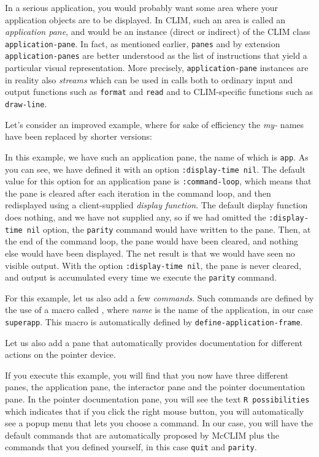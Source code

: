 In a serious application, you would probably want some area where your
application objects are to be displayed.  In CLIM, such an area is
called an \emph{application pane}, and would be an instance (direct or
indirect) of the CLIM class \texttt{application-pane}.  In fact, as
mentioned earlier, \texttt{panes} and by extension
\texttt{application-panes} are better understood as the list of
instructions that yield a particular visual representation. More
precisely, \texttt{application-pane} instances are in reality also
\emph{streams} which can be used in calls both to ordinary input and
output functions such as \texttt{format} and \texttt{read} and to
CLIM-specific functions such as \texttt{draw-line}.

Let's consider an improved example, where for sake of efficiency the
\emph{my-} names have been replaced by shorter versions:




In this example, we have such an application pane, the name of which
is \texttt{app}.  As you can see, we have defined it with an option
\texttt{:display-time nil}.  The default value for this option for an
application pane is \texttt{:command-loop}, which means that the pane
is cleared after each iteration in the command loop, and then
redisplayed using a client-supplied \emph{display function}.  The
default display function does nothing, and we have not supplied any,
so if we had omitted the \texttt{:display-time nil} option, the
\texttt{parity} command would have written to the pane.  Then, at the
end of the command loop, the pane would have been cleared, and nothing
else would have been displayed.  The net result is that we would have
seen no visible output.  With the option \texttt{:display-time nil},
the pane is never cleared, and output is accumulated every time we
execute the \texttt{parity} command.

For this example, let us also add a few \emph{commands}.  Such
commands are defined by the use of a macro called
, where
\textit{name} is the name of the application, in our case
\texttt{superapp}. This macro is automatically defined by
\texttt{define-application-frame}.

Let us also add a pane that automatically provides documentation for
different actions on the pointer device.

If you execute this example, you will find that you now have three
different panes, the application pane, the interactor pane and the
pointer documentation pane.  In the pointer documentation pane, you
will see the text \texttt{R possibilities} which indicates that if you
click the right mouse button, you will automatically see a popup menu
that lets you choose a command.  In our case, you will have the
default commands that are automatically proposed by McCLIM plus the
commands that you defined yourself, in this case \texttt{quit} and
\texttt{parity}.

